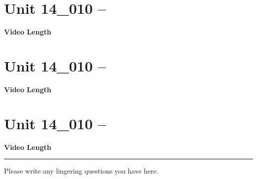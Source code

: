 \documentclass[letterpaper,12pt]{exam}
\newcommand{\unit}{Unit 14}
\begin{document}
\begin{questions}

\section*{\unit\_010 -- } 
\par{\selectfont\textbf{Video Length }}


\section*{\unit\_010 -- } 
\par{\selectfont\textbf{Video Length }}


\section*{\unit\_010 -- } 
\par{\selectfont\textbf{Video Length }}



\begin{center}
    \rule{0.5\textwidth}{.4pt}
\end{center}
Please write any lingering questions you have here.
\end{questions}
\end{document}
